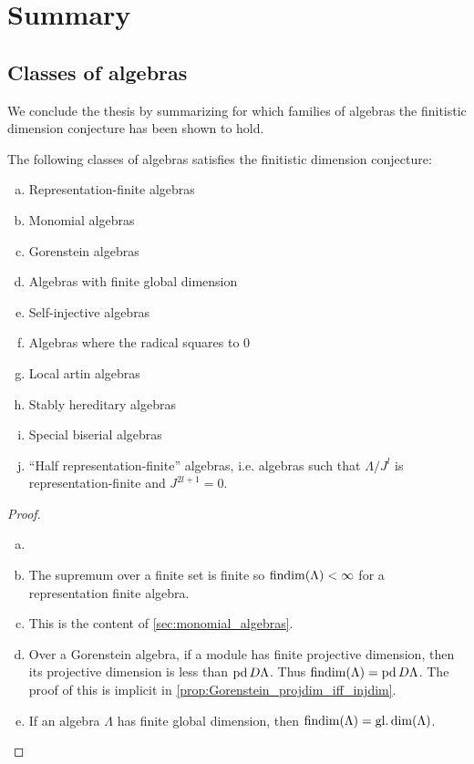 \section{Summary}\label{sec:summary}
\subsection{Classes of algebras}

We conclude the thesis by summarizing for which families of algebras the finitistic dimension conjecture has been shown to hold.

\begin{theorem}
	The following classes of algebras satisfies the finitistic dimension conjecture:
	\begin{enumerate}[a)]
		\item Representation-finite algebras
		\item Monomial algebras
		\item Gorenstein algebras
		\item Algebras with finite global dimension
		\item Self-injective algebras
		\item Algebras where the radical squares to 0
		\item Local artin algebras
		\item Stably hereditary algebras
		\item Special biserial algebras
		\item ``Half representation-finite'' algebras, i.e. algebras such that $\Lambda/J^l$ is representation-finite and $J^{2l+1}=0$.
	\end{enumerate}
	\begin{proof}
		\begin{enumerate}[(a)]
			\item[]
			\item The supremum over a finite set is finite so $\operatorname{findim}(\Lambda) < \infty$ for a representation finite algebra.
			\item This is the content of \cref{sec:monomial_algebras}.
			\item Over a Gorenstein algebra, if a module has finite projective dimension, then its projective dimension is less than $\operatorname{pd} D\Lambda$. Thus $\operatorname{findim}(\Lambda)=\operatorname{pd} D\Lambda$. The proof of this is implicit in \cref{prop:Gorenstein_projdim_iff_injdim}.
			\item If an algebra $\Lambda$ has finite global dimension, then $\operatorname{findim}(\Lambda) = \operatorname{gl.dim}(\Lambda)$.

\end{enumerate}
\end{proof}
\end{theorem}
